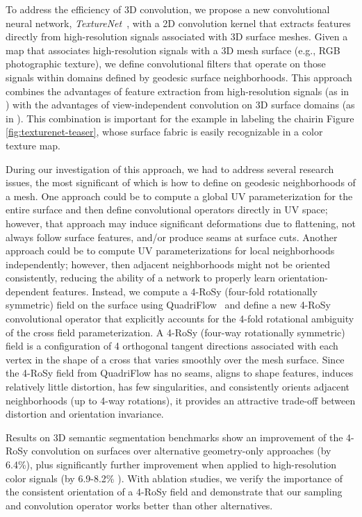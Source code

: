 To address the efficiency of 3D convolution, we propose a new convolutional neural network, \emph{TextureNet}~\cite{huang2018texturenet}, with a 2D convolution kernel that extracts features directly from high-resolution signals associated with 3D surface meshes.  Given a map that associates high-resolution signals with a 3D mesh surface (e.g., RGB photographic texture), we define convolutional filters that operate on those signals within domains defined by geodesic surface neighborhoods.   This approach combines the advantages of feature extraction from high-resolution signals (as in \cite{dai20183dmv}) with the advantages of view-independent convolution on 3D surface domains (as in \cite{tatarchenko2018tangent}).
This combination is important for the example in labeling the chairin Figure \ref{fig:texturenet-teaser}, whose surface fabric is easily recognizable in a color texture map.

During our investigation of this approach, we had to address several research issues, the most significant of which is how to define on geodesic neighborhoods of a mesh.   One approach could be to compute a global UV parameterization for the entire surface and then define convolutional operators directly in UV space; however, that approach may induce significant deformations due to flattening, not always follow surface features, and/or produce seams at surface cuts.  Another approach could be to compute UV parameterizations for local neighborhoods independently; however, then adjacent neighborhoods might not be oriented consistently, reducing the ability of a network to properly learn orientation-dependent features.   Instead, we compute a 4-RoSy (four-fold rotationally symmetric) field on the surface using QuadriFlow~\cite{huang2018quadriflow} and define a new 4-RoSy convolutional operator that explicitly accounts for the 4-fold rotational ambiguity of the cross field parameterization. A 4-RoSy (four-way rotationally symmetric) field is a configuration of 4 orthogonal tangent directions associated with each vertex in the shape of a cross that varies smoothly over the mesh surface.  Since the 4-RoSy field from QuadriFlow has no seams, aligns to shape features, induces relatively little distortion, has few singularities, and consistently orients adjacent neighborhoods (up to 4-way rotations), it provides an attractive trade-off between distortion and orientation invariance.

Results on 3D semantic segmentation benchmarks show an improvement of the 4-RoSy convolution on surfaces over alternative geometry-only approaches (by 6.4\%), plus significantly further improvement when applied to high-resolution color signals (by 6.9-8.2\% ).  With ablation studies, we verify the importance of the consistent orientation of a 4-RoSy field and demonstrate that our sampling and convolution operator works better than other alternatives.

